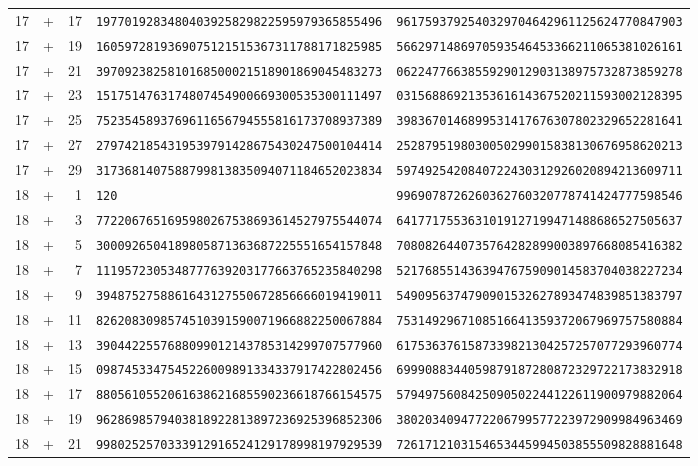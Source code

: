 \begin{longtable}{@{}rcrll@{}}
17&+&17&\texttt{1977019283480403925829822595979365855496}&\texttt{9617593792540329704642961125624770847903}\\
17&+&19&\texttt{1605972819369075121515367311788171825985}&\texttt{5662971486970593546453366211065381026161}\\
17&+&21&\texttt{3970923825810168500021518901869045483273}&\texttt{0622477663855929012903138975732873859278}\\
17&+&23&\texttt{1517514763174807454900669300535300111497}&\texttt{0315688692135361614367520211593002128395}\\
17&+&25&\texttt{7523545893769611656794555816173708937389}&\texttt{3983670146899531417676307802329652281641}\\
17&+&27&\texttt{2797421854319539791428675430247500104414}&\texttt{2528795198030050299015838130676958620213}\\
17&+&29&\texttt{3173681407588799813835094071184652023834}&\texttt{5974925420840722430312926020894213609711}\\
18&+&1&\texttt{120}&\texttt{9969078726260362760320778741424777598546}\\
18&+&3&\texttt{7722067651695980267538693614527975544074}&\texttt{6417717553631019127199471488686527505637}\\
18&+&5&\texttt{3000926504189805871363687225551654157848}&\texttt{7080826440735764282899003897668085416382}\\
18&+&7&\texttt{1119572305348777639203177663765235840298}&\texttt{5217685514363947675909014583704038227234}\\
18&+&9&\texttt{3948752758861643127550672856666019419011}&\texttt{5490956374790901532627893474839851383797}\\
18&+&11&\texttt{8262083098574510391590071966882250067884}&\texttt{7531492967108516641359372067969757580884}\\
18&+&13&\texttt{3904422557688099012143785314299707577960}&\texttt{6175363761587339821304257257077293960774}\\
18&+&15&\texttt{0987453347545226009891334337917422802456}&\texttt{6999088344059879187280872329722173832918}\\
18&+&17&\texttt{8805610552061638621685590236618766154575}&\texttt{5794975608425090502244122611900979882064}\\
18&+&19&\texttt{9628698579403818922813897236925396852306}&\texttt{3802034094772206799577223972909984963469}\\
18&+&21&\texttt{9980252570333912916524129178998197929539}&\texttt{7261712103154653445994503855509828881648}\\

\end{longtable}
